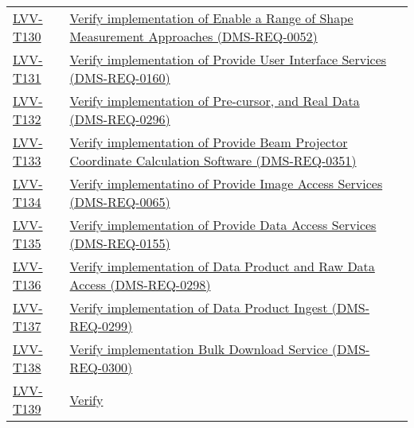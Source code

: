 \begin{longtable}[]{p{3cm}p{13cm}}
\protect\hyperlink{lvv-t130---verify-implementation-of-enable-a-range-of-shape-measurement-approaches-dms-req-0052}{LVV-T130}
&
\href{https://jira.lsstcorp.org/secure/Tests.jspa\#/testCase/LVV-T130}{Verify
implementation of Enable a Range of Shape Measurement Approaches
(DMS-REQ-0052)}\tabularnewline
\protect\hyperlink{lvv-t131---verify-implementation-of-provide-user-interface-services--dms-req-0160}{LVV-T131}
&
\href{https://jira.lsstcorp.org/secure/Tests.jspa\#/testCase/LVV-T131}{Verify
implementation of Provide User Interface Services
(DMS-REQ-0160)}\tabularnewline
\protect\hyperlink{lvv-t132---verify-implementation-of-pre-cursor-and-real-data-dms-req-0296}{LVV-T132}
&
\href{https://jira.lsstcorp.org/secure/Tests.jspa\#/testCase/LVV-T132}{Verify
implementation of Pre-cursor, and Real Data
(DMS-REQ-0296)}\tabularnewline
\protect\hyperlink{lvv-t133---verify-implementation-of-provide-beam-projector-coordinate-calculation-software-dms-req-0351}{LVV-T133}
&
\href{https://jira.lsstcorp.org/secure/Tests.jspa\#/testCase/LVV-T133}{Verify
implementation of Provide Beam Projector Coordinate Calculation Software
(DMS-REQ-0351)}\tabularnewline
\protect\hyperlink{lvv-t134---verify-implementatino-of-provide-image-access-services-dms-req-0065}{LVV-T134}
&
\href{https://jira.lsstcorp.org/secure/Tests.jspa\#/testCase/LVV-T134}{Verify
implementatino of Provide Image Access Services
(DMS-REQ-0065)}\tabularnewline
\protect\hyperlink{lvv-t135---verify-implementation-of-provide-data-access-services-dms-req-0155}{LVV-T135}
&
\href{https://jira.lsstcorp.org/secure/Tests.jspa\#/testCase/LVV-T135}{Verify
implementation of Provide Data Access Services
(DMS-REQ-0155)}\tabularnewline
\protect\hyperlink{lvv-t136---verify-implementation-of-data-product-and-raw-data-access-dms-req-0298}{LVV-T136}
&
\href{https://jira.lsstcorp.org/secure/Tests.jspa\#/testCase/LVV-T136}{Verify
implementation of Data Product and Raw Data Access
(DMS-REQ-0298)}\tabularnewline
\protect\hyperlink{lvv-t137---verify-implementation-of-data-product-ingest-dms-req-0299}{LVV-T137}
&
\href{https://jira.lsstcorp.org/secure/Tests.jspa\#/testCase/LVV-T137}{Verify
implementation of Data Product Ingest (DMS-REQ-0299)}\tabularnewline
\protect\hyperlink{lvv-t138---verify-implementation-bulk-download-service-dms-req-0300}{LVV-T138}
&
\href{https://jira.lsstcorp.org/secure/Tests.jspa\#/testCase/LVV-T138}{Verify
implementation Bulk Download Service (DMS-REQ-0300)}\tabularnewline
\protect\hyperlink{lvv-t139---verify-implementation-of-provide-pipeline-execution-services-dms-req-0156}{LVV-T139}
&
\href{https://jira.lsstcorp.org/secure/Tests.jspa\#/testCase/LVV-T139}{Verify
}
\end{longtable}
